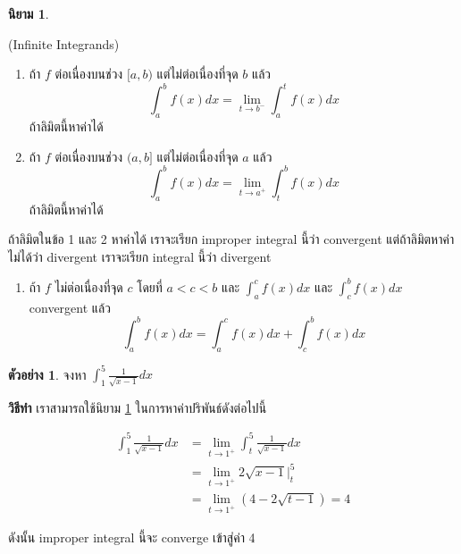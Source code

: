 \documentclass[
]{book}
\providecommand{\tightlist}{%
  \setlength{\itemsep}{0pt}\setlength{\parskip}{0pt}}
\theoremstyle{definition}
\newtheorem{definition}{นิยาม}[chapter]
\theoremstyle{definition}
\newtheorem{example}{ตัวอย่าง}[chapter]
\theoremstyle{definition}
\theoremstyle{definition}
\theoremstyle{remark}
\begin{document}
\begin{definition}
\protect\hypertarget{def:def-improper}{}\label{def:def-improper}

(Infinite Integrands)

\begin{enumerate}
\def\labelenumi{\arabic{enumi}.}
\item
  ถ้า \(f\) ต่อเนื่องบนช่วง \([a,b)\) แต่ไม่ต่อเนื่องที่จุด \(b\) แล้ว
  \[\int_{a}^b f(x) dx = \lim_{t \rightarrow b^{-}} \int_{a}^t f(x) dx\]
  ถ้าลิมิตนี้หาค่าได้
\item
  ถ้า \(f\) ต่อเนื่องบนช่วง \((a,b]\) แต่ไม่ต่อเนื่องที่จุด \(a\) แล้ว
  \[\int_{a}^b f(x) dx = \lim_{t \rightarrow a^{+}} \int_{t}^b f(x) dx\]
  ถ้าลิมิตนี้หาค่าได้
\end{enumerate}

ถ้าลิมิตในข้อ 1 และ 2 หาค่าได้ เราจะเรียก improper integral นี้ว่า convergent
แต่ถ้าลิมิตหาค่าไม่ได้ว่า divergent เราจะเรียก integral นี้ว่า divergent

\begin{enumerate}
\def\labelenumi{\arabic{enumi}.}
\setcounter{enumi}{2}
\tightlist
\item
  ถ้า \(f\) ไม่ต่อเนื่องที่จุด \(c\) โดยที่ \(a < c <b\) และ \(\int_{a}^{c} f(x) dx\)
  และ \(\int_{c}^{b} f(x) dx\) convergent แล้ว \[\int_{a}^{b} f(x) dx  = 
                \int_{a}^{c} f(x) dx + \int_{c}^{b} f(x) dx\]
\end{enumerate}

\end{definition}

\begin{example}
จงหา \(\int_{1}^{5} \frac{1}{\sqrt{x-1}} dx\)
\end{example}

\textbf{วิธีทำ} เราสามารถใช้นิยาม \ref{def:def-improper} ในการหาค่าปริพันธ์ดังต่อไปนี้

\begin{equation}
\begin{aligned}
  \int_{1}^{5} \frac{1}{\sqrt{x-1}} dx &= \lim_{t \rightarrow 1^{+} }\int_{t}^{5} \frac{1}{\sqrt{x-1}} dx \\
         &= \lim_{t \rightarrow 1^{+}} 2\sqrt{x-1} |_{t}^{5} \\
         &= \lim_{t \rightarrow 1^{+}} (4 - 2\sqrt{t-1}) = 4    
\end{aligned}
\end{equation}

ดังนั้น improper integral นี้จะ converge เข้าสู่ค่า 4
\end{document}
